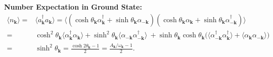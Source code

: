 \documentclass[aps, prx, nofootinbib, superscriptaddress]{revtex4-2}
\newcommand{\kvec}{\mathbf{k}}
\begin{document}
\noindent\textbf{Number Expectation in Ground State:}
\begin{align}
    \langle n_{\kvec} \rangle 
    = & \langle a_{\kvec}^{\dagger} a_{\kvec} \rangle 
    =  \langle 
    ( \cosh \theta_{\kvec} \alpha_{\kvec}^{\dagger} + \sinh \theta_{\kvec} \alpha_{-\kvec} ) 
    ( \cosh \theta_{\kvec} \alpha_{\kvec} + \sinh \theta_{\kvec} \alpha_{-\kvec}^{\dagger} ) 
    \rangle \\
    = & \cosh^{2} \theta_{\kvec} \langle  \alpha_{\kvec}^{\dagger} \alpha_{\kvec} \rangle 
    + \sinh^{2} \theta_{\kvec} \langle \alpha_{-\kvec} \alpha_{-\kvec}^{\dagger} \rangle \
    + \sinh \theta_{\kvec} \cosh \theta_{\kvec} 
    \big(\langle \alpha_{-\kvec}^{\dagger} \alpha_{\kvec}^{\dagger} \rangle + \langle \alpha_{\kvec} \alpha_{-\kvec} \rangle \big) \\
    = & \sinh^{2} \theta_{\kvec} 
    = \frac{\cosh 2 \theta_{\kvec} - 1}{2} 
    = \frac{A_{\kvec} / \omega_{\kvec} - 1}{2}.
\end{align}
\end{document}

